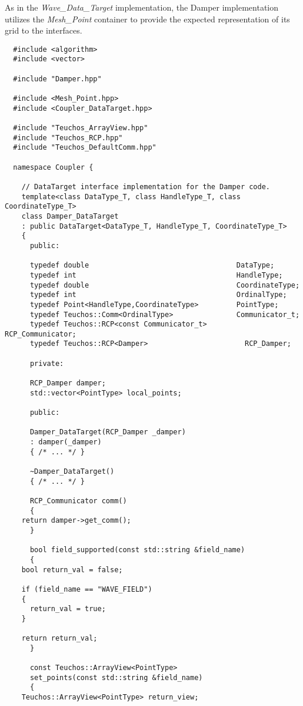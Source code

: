 \documentclass[letterpaper]{article}
\begin{document}
As in the {\sl Wave\_Data\_Target} implementation, the Damper
implementation utilizes the {\sl Mesh\_Point} container to provide the
expected representation of its grid to the interfaces.

\begin{lstlisting}
  #include <algorithm>
  #include <vector>

  #include "Damper.hpp"

  #include <Mesh_Point.hpp>
  #include <Coupler_DataTarget.hpp>

  #include "Teuchos_ArrayView.hpp"
  #include "Teuchos_RCP.hpp"
  #include "Teuchos_DefaultComm.hpp"

  namespace Coupler {

    // DataTarget interface implementation for the Damper code.
    template<class DataType_T, class HandleType_T, class CoordinateType_T>
    class Damper_DataTarget 
    : public DataTarget<DataType_T, HandleType_T, CoordinateType_T>
    {
      public:

      typedef double                                   DataType;
      typedef int                                      HandleType;
      typedef double                                   CoordinateType;
      typedef int                                      OrdinalType;
      typedef Point<HandleType,CoordinateType>         PointType;
      typedef Teuchos::Comm<OrdinalType>               Communicator_t;
      typedef Teuchos::RCP<const Communicator_t>       RCP_Communicator;
      typedef Teuchos::RCP<Damper>                       RCP_Damper;

      private:

      RCP_Damper damper;
      std::vector<PointType> local_points;

      public:

      Damper_DataTarget(RCP_Damper _damper)
      : damper(_damper)
      { /* ... */ }

      ~Damper_DataTarget()
      { /* ... */ }

      RCP_Communicator comm()
      {
	return damper->get_comm();
      }

      bool field_supported(const std::string &field_name)
      {
	bool return_val = false;

	if (field_name == "WAVE_FIELD")
	{
	  return_val = true;
	}

	return return_val;
      }

      const Teuchos::ArrayView<PointType> 
      set_points(const std::string &field_name)
      {
	Teuchos::ArrayView<PointType> return_view;


\end{lstlisting}
\end{document}
